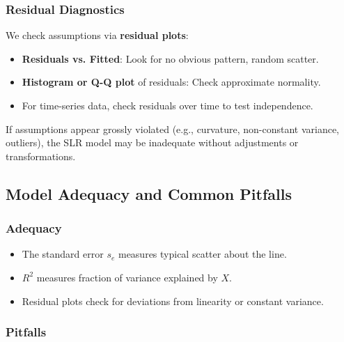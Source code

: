 \documentclass[10pt]{extarticle}
\begin{document}
\subsubsection{Residual Diagnostics}

We check assumptions via \textbf{residual plots}:
\begin{itemize}
    \item \textbf{Residuals vs. Fitted}: Look for no obvious pattern, random scatter.
    \item \textbf{Histogram or Q-Q plot} of residuals: Check approximate normality.
    \item For time-series data, check residuals over time to test independence.
\end{itemize}

If assumptions appear grossly violated (e.g., curvature, non-constant variance, outliers), the SLR model may be inadequate without adjustments or transformations.



\subsection{Model Adequacy and Common Pitfalls}

\subsubsection{Adequacy}

\begin{itemize}
    \item The standard error $s_e$ measures typical scatter about the line.
    \item $R^2$ measures fraction of variance explained by $X$.
    \item Residual plots check for deviations from linearity or constant variance.
\end{itemize}

\subsubsection{Pitfalls}
\end{document}
